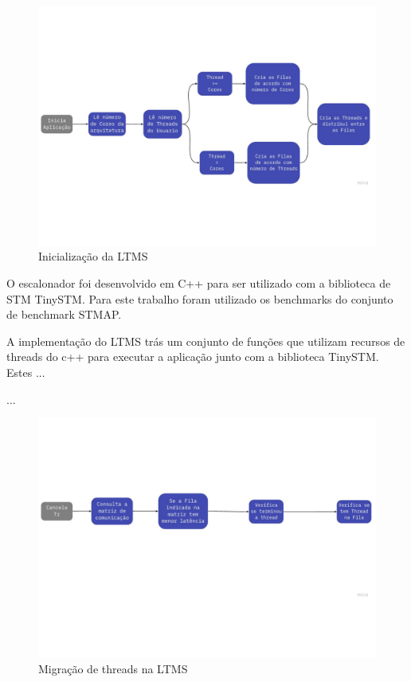 \documentclass[diss,capa]{texufpel}
\begin{document}
\begin{figure}[htbp]
  \centering \includegraphics[scale=.5]{images/lstm1}
\caption{Inicialização da LTMS} 
\label{LTMS1}
\end{figure}

O escalonador foi desenvolvido em C++ para ser utilizado com a biblioteca de STM TinySTM. Para este trabalho foram utilizado os benchmarks do conjunto de benchmark STMAP.


A implementação do LTMS trás um conjunto de funções que utilizam recursos de threads do c++ para executar a aplicação junto com a biblioteca TinySTM. Estes ...


...

\begin{figure}[htbp]
  \centering \includegraphics[scale=.5]{images/lstm2}
\caption{Migração de threads na LTMS} 
\label{LTMS2}
\end{figure}
\end{document}

